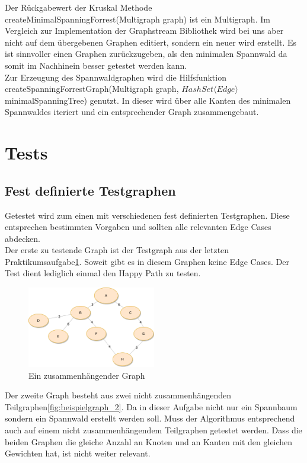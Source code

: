 \documentclass[a4paper]{article}
\begin{document}
Der Rückgabewert der Kruskal Methode createMinimalSpanningForrest(Multigraph graph) ist ein Multigraph. Im Vergleich zur Implementation der Graphstream Bibliothek wird bei uns aber nicht auf dem übergebenen Graphen editiert, sondern ein neuer wird erstellt. Es ist sinnvoller einen Graphen zurückzugeben, als den minimalen Spannwald da somit im Nachhinein besser getestet werden kann.\\
Zur Erzeugung des Spannwaldgraphen wird die Hilfsfunktion createSpanningForrestGraph(Multigraph graph, $HashSet\langle Edge\rangle$ minimalSpanningTree) genutzt. In dieser wird über alle Kanten des minimalen Spannwaldes iteriert und ein entsprechender Graph zusammengebaut.

\section{Tests}

\subsection{Fest definierte Testgraphen}

Getestet wird zum einen mit verschiedenen fest definierten Testgraphen. Diese entsprechen bestimmten Vorgaben und sollten alle relevanten Edge Cases abdecken.\\

Der erste zu testende Graph ist der Testgraph aus der letzten Praktikumsaufgabe\ref{fig:beispielgraph_4}. Soweit gibt es in diesem Graphen keine Edge Cases. Der Test dient lediglich einmal den Happy Path zu testen.

\begin{figure}[htbp]
	\centering
		\includegraphics[width=0.50\textwidth]{Latex/Figs/Beispielgraph_4.png}		
	\caption{Ein zusammenhängender Graph}
	\label{fig:beispielgraph_4}
\end{figure}

Der zweite Graph besteht aus zwei nicht zusammenhängenden Teilgraphen\ref{fig:beispielgraph_2}. Da in dieser Aufgabe nicht nur ein Spannbaum sondern ein Spannwald erstellt werden soll. Muss der Algorithmus entsprechend auch auf einem nicht zusammenhängendem Teilgraphen getestet werden. Dass die beiden Graphen die gleiche Anzahl an Knoten und an Kanten mit den gleichen Gewichten hat, ist nicht weiter relevant.
\end{document}
